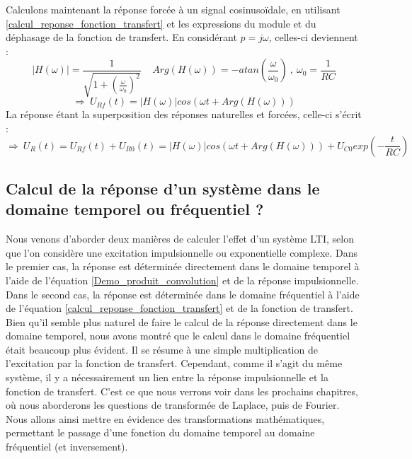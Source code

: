 \documentclass[]{book}
\begin{document}
{	Calculons maintenant la réponse forcée à un signal cosinusoïdale, en utilisant \ref{calcul_reponse_fonction_transfert} et les expressions du module et du déphasage de la fonction de transfert. En considérant $p=j\omega$, celles-ci deviennent :
	\begin{equation*}
	|H(\omega)|=\frac{1}{\sqrt{1+(\frac{\omega}{\omega_{0}})^{2}}}~~~~~Arg(H(\omega))=-atan(\frac{\omega}{\omega_{0}})~,~\omega_{0}=\frac{1}{RC}
	\end{equation*}
	\begin{equation*}
	\Rightarrow~U_{Rf}(t)=|H(\omega)|cos(\omega t+Arg(H(\omega)))
	\end{equation*}
	La réponse étant la superposition des réponses naturelles et forcées, celle-ci s'écrit :
	\begin{equation*}
	\Rightarrow~U_{R}(t)=U_{Rf}(t)+U_{R0}(t)=|H(\omega)|cos(\omega t+Arg(H(\omega)))+U_{C0}exp(-\frac{t}{RC})
	\end{equation*}
	
	\vspace{1\baselineskip}

	\subsection{Calcul de la réponse d'un système dans le domaine temporel ou fréquentiel ?}
	
	Nous venons d'aborder deux manières de calculer l'effet d'un système LTI, selon que l'on considère une excitation impulsionnelle ou exponentielle complexe. Dans le premier cas, la réponse est déterminée directement dans le domaine temporel à l'aide de l'équation \ref{Demo_produit_convolution} et de la réponse impulsionnelle. Dans le second cas, la réponse est déterminée dans le domaine fréquentiel à l'aide de l'équation \ref{calcul_reponse_fonction_transfert} et de la fonction de transfert.	
	Bien qu'il semble plus naturel de faire le calcul de la réponse directement dans le domaine temporel, nous avons montré que le calcul dans le domaine fréquentiel était beaucoup plus évident. Il se résume à une simple multiplication de l'excitation par la fonction de transfert. 
	Cependant, comme il s'agit du même système, il y a nécessairement un lien entre la réponse impulsionnelle et la fonction de transfert. C'est ce que nous verrons voir dans les prochains chapitres, où nous aborderons les questions de transformée de Laplace, puis de Fourier. Nous allons ainsi mettre en évidence des transformations mathématiques, permettant le passage d'une fonction du domaine temporel au domaine fréquentiel (et inversement).
	
}
\end{document}
